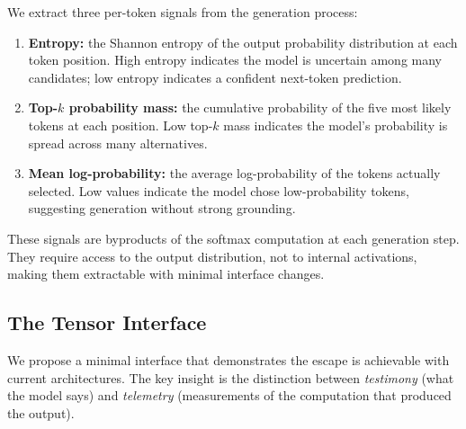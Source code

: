 We extract three per-token signals from the generation process:

\begin{enumerate}
  \item \textbf{Entropy:} the Shannon entropy of the output probability
  distribution at each token position. High entropy indicates the model
  is uncertain among many candidates; low entropy indicates a confident
  next-token prediction.
  \item \textbf{Top-$k$ probability mass:} the cumulative probability of
  the five most likely tokens at each position. Low top-$k$ mass indicates
  the model's probability is spread across many alternatives.
  \item \textbf{Mean log-probability:} the average log-probability of the
  tokens actually selected. Low values indicate the model chose
  low-probability tokens, suggesting generation without strong grounding.
\end{enumerate}

These signals are byproducts of the softmax computation at each generation
step. They require access to the output distribution, not to internal
activations, making them extractable with minimal interface changes.


\subsection{The Tensor Interface}

We propose a minimal interface that demonstrates the escape is achievable with
current architectures. The key insight is the distinction between
\emph{testimony} (what the model says) and \emph{telemetry} (measurements of
the computation that produced the output).


